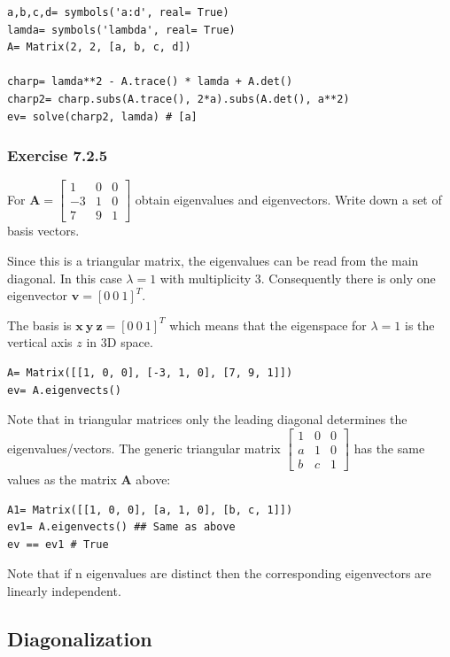 \begin{verbatim}
a,b,c,d= symbols('a:d', real= True)
lamda= symbols('lambda', real= True)
A= Matrix(2, 2, [a, b, c, d])

charp= lamda**2 - A.trace() * lamda + A.det()
charp2= charp.subs(A.trace(), 2*a).subs(A.det(), a**2)
ev= solve(charp2, lamda) # [a]
\end{verbatim}

\subsubsection{Exercise 7.2.5}

For $\mathbf{A} = \left[\begin{matrix}1 & 0 & 0\\-3 & 1 & 0\\7 & 9 & 1\end{matrix}\right]$
obtain eigenvalues and eigenvectors. Write down a set of basis vectors.

Since this is a triangular matrix, the eigenvalues can be read from the main diagonal.
In this case $\lambda= 1$ with multiplicity 3. Consequently there is only one eigenvector
$\mathbf{v}= [0\ 0\ 1]^T$.

The basis is $\mathbf{x\ y\ z}= [0\ 0\ 1]^T$ which means that the eigenspace for
$\lambda= 1$ is the vertical axis $z$ in 3D space.

\begin{verbatim}
A= Matrix([[1, 0, 0], [-3, 1, 0], [7, 9, 1]])
ev= A.eigenvects()
\end{verbatim}

Note that in triangular matrices only the leading diagonal determines the eigenvalues/vectors.
The generic triangular matrix $\left[\begin{matrix}1 & 0 & 0\\a & 1 & 0\\b & c & 1\end{matrix}\right]$
has the same values as the matrix \textbf{A} above:

\begin{verbatim}
A1= Matrix([[1, 0, 0], [a, 1, 0], [b, c, 1]])
ev1= A.eigenvects() ## Same as above
ev == ev1 # True
\end{verbatim}

Note that if n eigenvalues are distinct then the corresponding eigenvectors are
linearly independent.

\subsection{Diagonalization}

